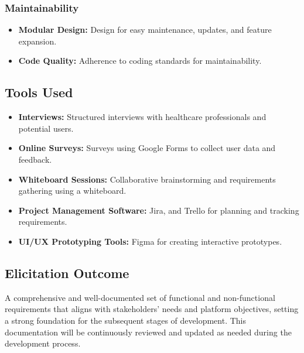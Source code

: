 \documentclass[12pt]{article}
\begin{document}
\subsubsection{Maintainability}
\begin{itemize}
\item \textbf{Modular Design:} Design for easy maintenance, updates, and feature expansion.
    \item \textbf{Code Quality:} Adherence to coding standards for maintainability.
\end{itemize}

\subsection{Tools Used}
\begin{itemize}
\item \textbf{Interviews:} Structured interviews with healthcare professionals and potential users.
\item \textbf{Online Surveys:} Surveys using Google Forms to collect user data and feedback.
\item \textbf{Whiteboard Sessions:} Collaborative brainstorming and requirements gathering using a whiteboard.
\item \textbf{Project Management Software:} Jira, and Trello for planning and tracking requirements.
\item \textbf{UI/UX Prototyping Tools:} Figma for creating interactive prototypes.
\end{itemize}

\subsection{Elicitation Outcome}
A comprehensive and well-documented set of functional and non-functional requirements that aligns with stakeholders' needs and platform objectives, setting a strong foundation for the subsequent stages of development. This documentation will be continuously reviewed and updated as needed during the development process.
\end{document}
